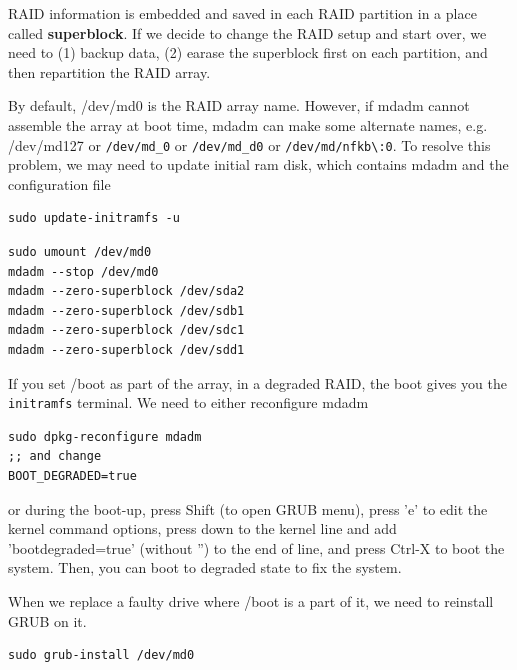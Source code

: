 RAID information is embedded and saved in each RAID partition in a place called
{\bf superblock}. If we decide to change the RAID setup and start over, we need
to (1) backup data, (2) earase the superblock first on each partition, and
then repartition the RAID array.

By default, /dev/md0 is the RAID array name. However, if mdadm cannot
assemble the array at boot time, mdadm can make some alternate names, e.g.
/dev/md127 or \verb!/dev/md_0! or \verb!/dev/md_d0! or
\verb!/dev/md/nfkb\:0!. To resolve this problem, we may need to update initial
ram disk, which contains mdadm and the configuration file
\begin{verbatim}
sudo update-initramfs -u
\end{verbatim}

\begin{verbatim}
sudo umount /dev/md0
mdadm --stop /dev/md0
mdadm --zero-superblock /dev/sda2
mdadm --zero-superblock /dev/sdb1
mdadm --zero-superblock /dev/sdc1
mdadm --zero-superblock /dev/sdd1
\end{verbatim}

If you set /boot as part of the array, in a degraded RAID, the boot gives you
the \verb!initramfs! terminal. We need to either reconfigure mdadm
\begin{verbatim}
sudo dpkg-reconfigure mdadm
;; and change 
BOOT_DEGRADED=true
\end{verbatim}
or during the boot-up, press Shift (to open GRUB menu), press 'e'	to edit the
kernel command options, press down to the kernel line and add
'bootdegraded=true' (without '') to the end of line, and press Ctrl-X to boot
the system. Then, you can boot to degraded state to fix the system.

When we replace a faulty drive where /boot is a part of it, we need to
reinstall GRUB on it.
\begin{verbatim}
sudo grub-install /dev/md0
\end{verbatim}


